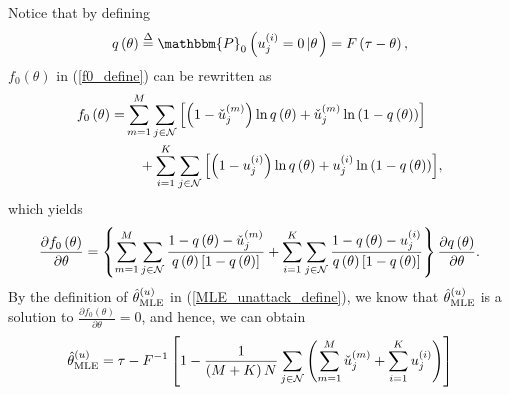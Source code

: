 \documentclass[11pt, draftclsnofoot, onecolumn]{IEEEtran}
\newcommand{\bbP}{\mathbbm{P}}
\begin{document}




Notice that by defining
\begin{equation} \label{q_define}
q\left( \theta  \right) \buildrel \Delta \over = {\bbP_0}\left( {u_j^{(i)} = 0\left| \theta  \right.} \right) = F\left( {\tau  - \theta } \right),
\end{equation}
  $f_0(\theta)$ in (\ref{f0_define})   can be rewritten as
\begin{align} \notag
{f_0}\left( \theta  \right) = & \sum\limits_{m = 1}^M {\sum\limits_{j \in {\cal N}} {\left[ {\left( {1 - {\check{u}}_j^{(m)}} \right)\ln q\left( \theta  \right) + {\check{u}}_j^{(m)}\ln \left( {1 - q\left( \theta  \right)} \right)} \right]} } \\
& \quad + \sum\limits_{i = 1}^K {\sum\limits_{j \in {\cal N}} {\left[ {\left( {1 - u_j^{(i)}} \right)\ln q\left( \theta  \right) + u_j^{(i)}\ln \left( {1 - q\left( \theta  \right)} \right)} \right]} },
\end{align}
which yields
\begin{align} \label{diff_f0}
\frac{{\partial {f_0}\left( \theta  \right)}}{{\partial \theta }} = \left\{ {\sum\limits_{m = 1}^M {\sum\limits_{j \in {\cal N}} {\frac{{1 - q\left( \theta  \right) - {\check{u}}_j^{(m)}}}{{q\left( \theta  \right)\left[ {1 - q\left( \theta  \right)} \right]}}} }  + \sum\limits_{i = 1}^K {\sum\limits_{j \in {\cal N}} {\frac{{1 - q\left( \theta  \right) - u_j^{(i)}}}{{q\left( \theta  \right)\left[ {1 - q\left( \theta  \right)} \right]}}} } } \right\}\frac{{\partial q\left( \theta  \right)}}{{\partial \theta }}.
\end{align}
By the definition of $\hat \theta _{{\rm{MLE}}}^{(u)}$ in (\ref{MLE_unattack_define}), we know that $\hat \theta _{{\rm{MLE}}}^{(u)}$ is a solution   to   $\frac{{\partial {f_0}\left( \theta  \right)}}{{\partial \theta }} =0$, and hence,  we can obtain
\begin{equation} \label{theta_0_MLE}
\hat \theta _{{\rm{MLE}}}^{(u)} = \tau  - {F^{ - 1}}\left[ {1 - \frac{1}{{\left( {M + K} \right)N}}\sum\limits_{j \in {\cal N}} {\left( {\sum\limits_{m = 1}^M {{\check{u}}_j^{(m)}}  + \sum\limits_{i = 1}^K {u_j^{(i)}} } \right)} } \right]
\end{equation}
\end{document}
